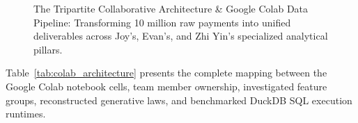 \documentclass[11pt,a4paper]{article}
\begin{document}
\begin{figure}[H]
{%
}
\caption{The Tripartite Collaborative Architecture \& Google Colab Data Pipeline: Transforming 10 million raw payments into unified deliverables across Joy's, Evan's, and Zhi Yin's specialized analytical pillars.}
\label{fig:colab_pipeline}
\end{figure}

Table~\ref{tab:colab_architecture} presents the complete mapping between the Google Colab notebook cells, team member ownership, investigated feature groups, reconstructed generative laws, and benchmarked DuckDB SQL execution runtimes.
\end{document}
